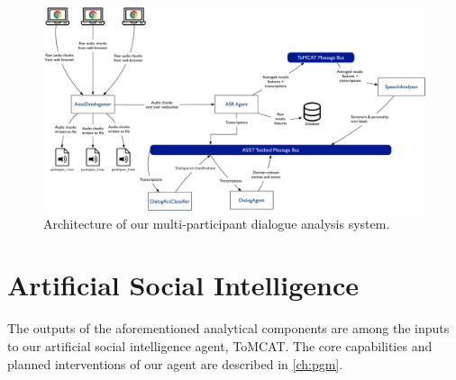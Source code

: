 \begin{figure}
    \centering
    \includegraphics[width=6in]{images/nlp_architecture}
    \caption{Architecture of our multi-participant dialogue analysis system.}
    \label{fig:nlp-architecture}
\end{figure}

\section{Artificial Social Intelligence}

The outputs of the aforementioned analytical components are among the inputs to
our artificial social intelligence agent, ToMCAT. The core capabilities and
planned interventions of our agent are described in \autoref{ch:pgm}.
